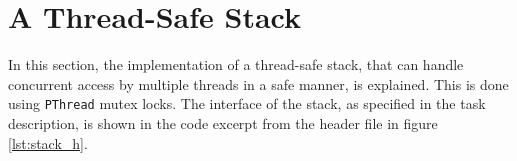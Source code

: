 %
%
%
\section{A Thread-Safe Stack}
In this section, the implementation of a thread-safe stack, that can handle
concurrent access by multiple threads in a safe manner, is explained. This is
done using \verb|PThread| mutex locks. The interface of the stack, as specified
in the task description, is shown in the code excerpt from the header file
 in figure \ref{lst:stack_h}.

